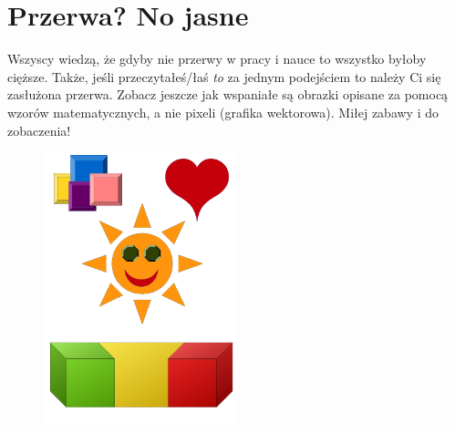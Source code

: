 \documentclass[12pt, a4paper]{article}
\begin{document}
\section{Przerwa? No jasne}
Wszyscy wiedzą, że gdyby nie przerwy w pracy i nauce to wszystko byłoby cięższe. Także, jeśli przeczytałeś/łaś \emph{to} za jednym podejściem to należy Ci się zasłużona przerwa. Zobacz jeszcze jak wspaniałe są obrazki opisane za pomocą wzorów matematycznych, a nie pixeli (grafika wektorowa). Miłej zabawy i do zobaczenia!
\begin{figure}[htbp]
	\centering
		\includegraphics[width=0.50\textwidth]{lol2.pdf}
	\label{fig:lol2}
\end{figure}





 
\end{document}
